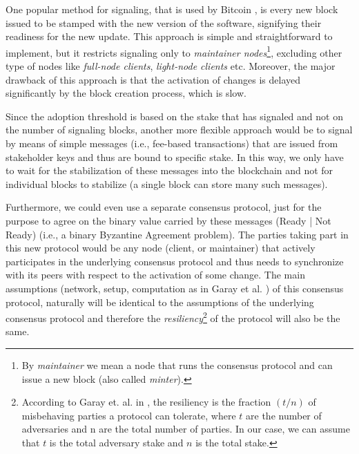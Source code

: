 One popular method for signaling, that is used by Bitcoin \cite{bitcoin}, is every new block issued to be stamped with the new version of the software, signifying their readiness for the new update. This approach is simple and straightforward to implement, but it restricts signaling only to \emph{maintainer nodes}\footnote{By \emph{maintainer} we mean a node that runs the consensus protocol and can issue a new block (also called \emph{minter}).}, excluding other type of nodes like \emph{full-node clients}, \emph{light-node clients} etc. Moreover, the major drawback of this approach is that the activation of changes is delayed significantly by the block creation process, which is slow.

Since the adoption threshold is based on the stake that has signaled and not on the number of signaling blocks, another more flexible approach would be to signal by means of simple messages (i.e., fee-based transactions) that are issued from stakeholder keys and thus are bound to specific stake. In this way, we only have to wait for the stabilization of these messages into the blockchain and not for individual blocks to stabilize (a single block can store many such messages).

Furthermore, we could even use a separate consensus protocol, just for the purpose to agree on the binary value carried by these messages (Ready | Not Ready) (i.e., a binary Byzantine Agreement problem). The parties taking part in this new protocol would be any node (client, or maintainer) that actively participates in the underlying consensus protocol and thus needs to synchronize with its peers with respect to the activation of some change. The main assumptions (network, setup, computation as in Garay et al. \cite{sok}) of this consensus protocol, naturally will be identical to the assumptions of the underlying consensus protocol and therefore the \emph{resiliency}\footnote{According to Garay et. al. in \cite{sok}, the resiliency is the fraction $(t/n)$ of misbehaving parties a protocol can tolerate, where $t$ are the number of adversaries and n are the total number of parties. In our case, we can assume that $t$ is the total adversary stake and $n$ is the total stake.} of the protocol will also be the same. 

